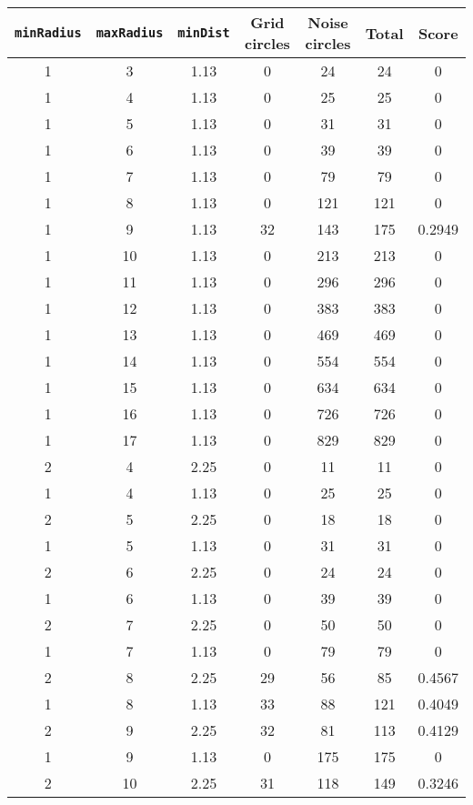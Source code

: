 \documentclass[letterpaper, 12pt]{article}
\begin{document}
\begin{longtable}{|c|c|c|c|c|c|c|}
\hline
\textbf{\texttt{minRadius}} & \textbf{\texttt{maxRadius}} & \textbf{\texttt{minDist}} & \textbf{Grid circles} & \textbf{Noise circles} & \textbf{Total} & \textbf{Score} \\
\hline
1 & 3 & 1.13 & 0 & 24 & 24 & 0 \\
\hline
1 & 4 & 1.13 & 0 & 25 & 25 & 0 \\
\hline
1 & 5 & 1.13 & 0 & 31 & 31 & 0 \\
\hline
1 & 6 & 1.13 & 0 & 39 & 39 & 0 \\
\hline
1 & 7 & 1.13 & 0 & 79 & 79 & 0 \\
\hline
1 & 8 & 1.13 & 0 & 121 & 121 & 0 \\
\hline
1 & 9 & 1.13 & 32 & 143 & 175 & 0.2949 \\
\hline
1 & 10 & 1.13 & 0 & 213 & 213 & 0 \\
\hline
1 & 11 & 1.13 & 0 & 296 & 296 & 0 \\
\hline
1 & 12 & 1.13 & 0 & 383 & 383 & 0 \\
\hline
1 & 13 & 1.13 & 0 & 469 & 469 & 0 \\
\hline
1 & 14 & 1.13 & 0 & 554 & 554 & 0 \\
\hline
1 & 15 & 1.13 & 0 & 634 & 634 & 0 \\
\hline
1 & 16 & 1.13 & 0 & 726 & 726 & 0 \\
\hline
1 & 17 & 1.13 & 0 & 829 & 829 & 0 \\
\hline
2 & 4 & 2.25 & 0 & 11 & 11 & 0 \\
\hline
1 & 4 & 1.13 & 0 & 25 & 25 & 0 \\
\hline
2 & 5 & 2.25 & 0 & 18 & 18 & 0 \\
\hline
1 & 5 & 1.13 & 0 & 31 & 31 & 0 \\
\hline
2 & 6 & 2.25 & 0 & 24 & 24 & 0 \\
\hline
1 & 6 & 1.13 & 0 & 39 & 39 & 0 \\
\hline
2 & 7 & 2.25 & 0 & 50 & 50 & 0 \\
\hline
1 & 7 & 1.13 & 0 & 79 & 79 & 0 \\
\hline
2 & 8 & 2.25 & 29 & 56 & 85 & 0.4567 \\
\hline
1 & 8 & 1.13 & 33 & 88 & 121 & 0.4049 \\
\hline
2 & 9 & 2.25 & 32 & 81 & 113 & 0.4129 \\
\hline
1 & 9 & 1.13 & 0 & 175 & 175 & 0 \\
\hline
2 & 10 & 2.25 & 31 & 118 & 149 & 0.3246 \\

\end{longtable}
\end{document}

